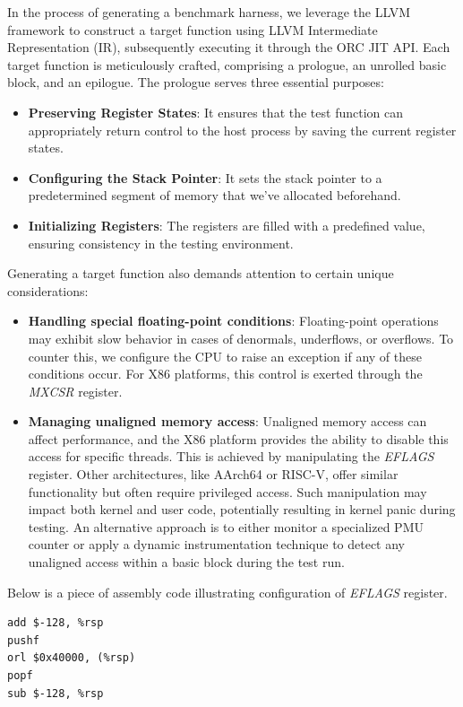 In the process of generating a benchmark harness, we leverage the LLVM framework to construct a target 
function using LLVM Intermediate Representation (IR), subsequently executing it through the ORC JIT API. 
Each target function is meticulously crafted, comprising a prologue, an unrolled basic block, and an 
epilogue. The prologue serves three essential purposes:

\begin{itemize}
	\item \textbf{Preserving Register States}: It ensures that the test function can appropriately return control to the host process by saving the current register states.
	\item \textbf{Configuring the Stack Pointer}: It sets the stack pointer to a predetermined segment of memory that we've allocated beforehand.
	\item \textbf{Initializing Registers}: The registers are filled with a predefined value, ensuring consistency in the testing environment.
\end{itemize}

Generating a target function also demands attention to certain unique considerations:
\begin{itemize}
	\item \textbf{Handling special floating-point conditions}: Floating-point operations may exhibit slow behavior in cases of denormals, underflows, or overflows. To counter this, we configure the CPU to raise an exception if any of these conditions occur. For X86 platforms, this control is exerted through the \textit{MXCSR} register.
	\item \textbf{Managing unaligned memory access}: Unaligned memory access can affect performance, and the X86 platform provides the ability to disable this access for specific threads. This is achieved by manipulating the \textit{EFLAGS} register. Other architectures, like AArch64 or RISC-V, offer similar functionality but often require privileged access. Such manipulation may impact both kernel and user code, potentially resulting in kernel panic during testing. An alternative approach is to either monitor a specialized PMU counter or apply a dynamic instrumentation technique to detect any unaligned access within a basic block during the test run.
\end{itemize}

Below is a piece of assembly code illustrating configuration of \textit{EFLAGS} register.

\begin{lstlisting}
add $-128, %rsp
pushf
orl $0x40000, (%rsp)
popf
sub $-128, %rsp
\end{lstlisting}

